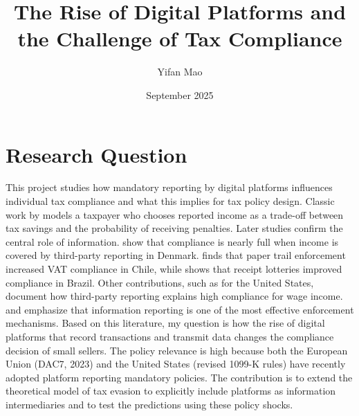 \documentclass[11pt]{article}
\title{The Rise of Digital Platforms and the Challenge of Tax Compliance}
\author{Yifan Mao}
\date{September 2025}
\begin{document}
\maketitle

\section*{Research Question}
This project studies how mandatory reporting by digital platforms influences individual tax compliance and what this implies for tax policy design. Classic work by \citet{allingham1972income} models a taxpayer who chooses reported income as a trade-off between tax savings and the probability of receiving penalties. Later studies confirm the central role of information. \citet{kleven2011unwilling} show that compliance is nearly full when income is covered by third-party reporting in Denmark. \citet{pomeranz2015no} finds that paper trail enforcement increased VAT compliance in Chile, while \citet{naritomi2019consumers} shows that receipt lotteries improved compliance in Brazil. Other contributions, such as \citet{guyton2021tax} for the United States, document how third-party reporting explains high compliance for wage income. \citet{slemrod2002tax} and \citet{slemrod2019tax} emphasize that information reporting is one of the most effective enforcement mechanisms. Based on this literature, my question is how the rise of digital platforms that record transactions and transmit data changes the compliance decision of small sellers. The policy relevance is high because both the European Union (DAC7, 2023) and the United States (revised 1099-K rules) have recently adopted platform reporting mandatory policies. The contribution is to extend the theoretical model of tax evasion to explicitly include platforms as information intermediaries and to test the predictions using these policy shocks.
\end{document}
